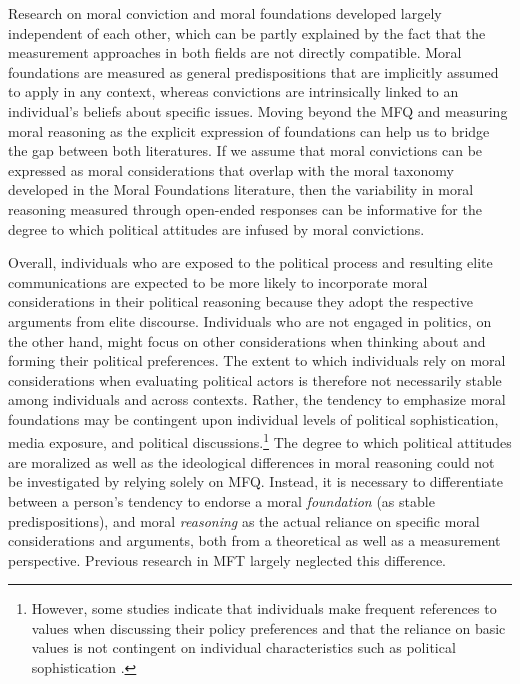 \documentclass[12pt]{article}
\begin{document}
Research on moral conviction and moral foundations developed largely independent of each other, which can be partly explained by the fact that the measurement approaches in both fields are not directly compatible. Moral foundations are measured as general predispositions that are implicitly assumed to apply in any context, whereas convictions are intrinsically linked to an individual's beliefs about specific issues. Moving beyond the MFQ and measuring moral reasoning as the explicit expression of foundations can help us to bridge the gap between both literatures. If we assume that moral convictions can be expressed as moral considerations that overlap with the moral taxonomy developed in the Moral Foundations literature, then the variability in moral reasoning measured through open-ended responses can be informative for the degree to which political attitudes are infused by moral convictions.

Overall, individuals who are exposed to the political process and resulting elite communications are expected to be more likely to incorporate moral considerations in their political reasoning because they adopt the respective arguments from elite discourse. Individuals who are not engaged in politics, on the other hand, might focus on other considerations when thinking about and forming their political preferences. The extent to which individuals rely on moral considerations when evaluating political actors is therefore not necessarily stable among individuals and across contexts. Rather, the tendency to emphasize moral foundations may be contingent upon individual levels of political sophistication, media exposure, and political discussions.\footnote{However, some studies indicate that individuals make frequent references to values when discussing their policy preferences \citep{feldman1992political} and that the reliance on basic values is not contingent on individual characteristics such as political sophistication \citep[e.g.][]{goren2001core,goren2004political,marietta2007values}.} The degree to which political attitudes are moralized as well as the ideological differences in moral reasoning could not be investigated by relying solely on MFQ. Instead, it is necessary to differentiate between a person's tendency to endorse a moral \textit{foundation} (as stable predispositions), and moral \textit{reasoning} as the actual reliance on specific moral considerations and arguments, both from a theoretical as well as a measurement perspective. Previous research in MFT largely neglected this difference.
\end{document}
